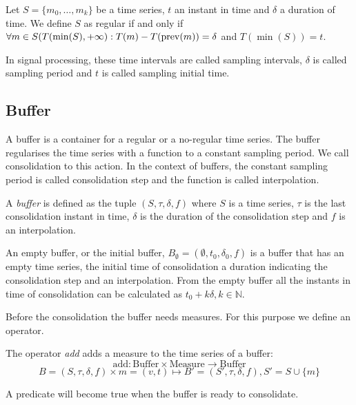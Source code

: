\begin{definition}
  Let $S=\{m_0,\ldots,m_k\}$ be a time series, $t$ an instant in time
  and $\delta$ a duration of time. We define $S$ as regular if and
  only if $\forall m \in S(T(\min(S),+\infty):T(m) - T(\operatorname*{prev}(m)) =
  \delta$ and $T(\min(S))=t$.
\end{definition}

In signal processing, these time intervals are called sampling
intervals, $\delta$ is called sampling period and $t$ is called
sampling initial time.  


\subsection{Buffer}\label{sec:model:buffer}

A buffer is a container for a regular or a no-regular time series. The
buffer regularises the time series with a function to a constant
sampling period. We call consolidation to this action. In the context
of buffers, the constant sampling period is called consolidation step
and the function is called interpolation.

\begin{definition}[Buffer]
  A \emph{buffer} is defined as the tuple $(S,\tau,\delta,f)$ where
  $S$ is a time series, $\tau$ is the last consolidation instant in
  time, $\delta$ is the duration of the consolidation step and $f$ is
  an interpolation.
\end{definition}

An empty buffer, or the initial buffer, $B_{\emptyset} =
(\emptyset,t_0, \delta_0, f)$ is a buffer that has an empty time
series, the initial time of consolidation a duration indicating the
consolidation step and an interpolation. From the empty buffer all the
instants in time of consolidation can be calculated as $t_0+k\delta,
k\in\mathbb{N}$. 

Before the consolidation the buffer needs measures. For this purpose
we define an operator.

\begin{definition}
  The operator \emph{add} adds a measure to the time series of a buffer:
  \[
  \text{add}: \text{Buffer} \times \text{Measure} \longrightarrow \text{Buffer}
  \]
  \[
   B = (S,\tau,\delta,f)  \times m = (v,t) \mapsto B'= (S',\tau,\delta,f),
   S' = S \cup \{m\}
   \] 
\end{definition}

A predicate will become true when the buffer is ready to consolidate.

